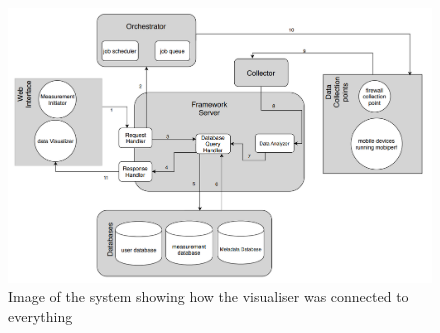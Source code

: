 \begin{figure}
	\centering
	\includegraphics[width=0.7\linewidth]{images/system}
	\caption{Image of the system showing how the visualiser was connected to everything}
	\label{fig:system}
\end{figure}
